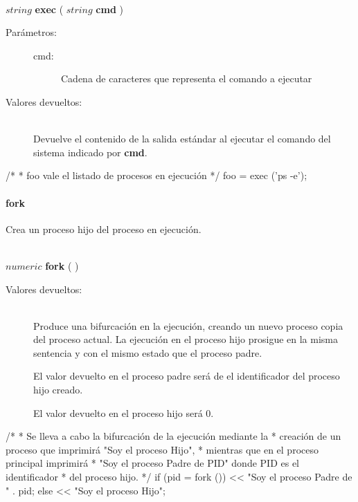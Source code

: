 \begin{framed}
\hfill \\ $string$ \textbf{exec} ( $string$ \textbf{cmd} )  
\begin{description}
\item [Parámetros:] \hfill 
   \begin{description}
   \item[cmd:] Cadena de caracteres que representa el comando a ejecutar
   \end{description}
\item[Valores devueltos:] \hfill \\
   Devuelve el contenido de la salida estándar al ejecutar el comando del sistema indicado por \textbf{cmd}.
\end{description}
\end{framed}
     
\begin{myverbatim}   
   /*
    * foo vale el listado de procesos en ejecución
    */
   foo = exec ('ps -e');
\end{myverbatim}

\paragraph{fork}
Crea un proceso hijo del proceso en ejecución.


\begin{framed}
\hfill \\ $numeric$ \textbf{fork} ( )  
\begin{description}
\item[Valores devueltos:] \hfill \\
   Produce una bifurcación en la ejecución, creando un nuevo proceso copia del 
   proceso actual. La ejecución en el proceso hijo prosigue en la misma sentencia 
   y con el mismo estado que el proceso padre. 
   
   El valor devuelto en el proceso padre será de el identificador del proceso hijo creado. 
   
   El valor devuelto en el proceso hijo será $0$.
\end{description}
\end{framed}
     
\begin{myverbatim}   
   /*
    * Se lleva a cabo la bifurcación de la ejecución mediante la 
    * creación de un proceso que imprimirá "Soy el proceso Hijo",
    * mientras que en el proceso principal imprimirá 
    * "Soy el proceso Padre de PID" donde PID es el identificador
    * del proceso hijo.
    */
    if (pid = fork ()) 
      << "Soy el proceso Padre de " . pid;
    else
      << "Soy el proceso Hijo";
\end{myverbatim}

